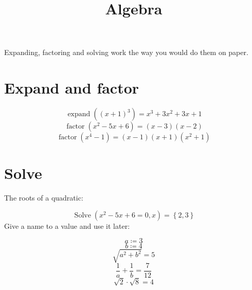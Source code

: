 \documentclass[11pt,a4paper]{article}
\title{Algebra}
\date{}
\theoremstyle{plain}
\theoremstyle{definition}
\theoremstyle{remark}
\begin{document}
\maketitle
Expanding, factoring and solving work the way you would do them on paper.

\section*{Expand and factor}

\begin{equation*}
  \operatorname{expand}((x + 1)^3) = x^{3} + 3 x^{2} + 3 x + 1
\end{equation*}
\begin{equation*}
  \operatorname{factor}(x^2 - 5 x + 6) = \left(x - 3\right) \left(x - 2\right)
\end{equation*}
\begin{equation*}
  \operatorname{factor}(x^4 - 1) = \left(x - 1\right) \left(x + 1\right) \left(x^{2} + 1\right)
\end{equation*}
\section*{Solve}

The roots of a quadratic:

\begin{equation*}
  \operatorname{Solve}(x^2 - 5 x + 6 = 0, x) = \left\{2, 3\right\}
\end{equation*}
Give a name to a value and use it later:

\begin{equation*}
  a \coloneqq  3
\end{equation*}
\begin{equation*}
  b \coloneqq  4
\end{equation*}
\begin{equation*}
  \sqrt{a^2 + b^2} = 5
\end{equation*}
\begin{equation*}
  \frac{1}{a} + \frac{1}{b} = \frac{7}{12}
\end{equation*}
\begin{equation*}
  \sqrt{2} \cdot \sqrt{8} = 4
\end{equation*}
\end{document}
